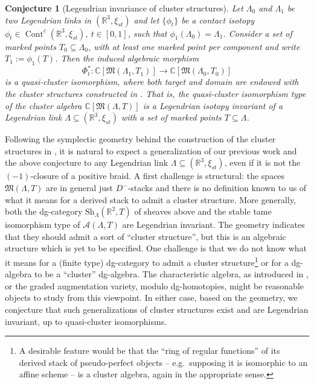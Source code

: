 \documentclass[10pt]{amsart}
\theoremstyle{plain}
\newtheorem{conj}[thm]{Conjecture}
\theoremstyle{definition}
\theoremstyle{remark}
\numberwithin{equation}{section}
\newcommand{\R}{\mathbb{R}}
\newcommand{\C}{\mathbb{C}}
\newcommand{\SA}{\mathcal{A}}
\newcommand{\fM}{\mathfrak{M}}
\newcommand{\La}{\Lambda}
\newcommand{\sse}{\subseteq}
\newcommand{\lr}{\longrightarrow}
\newcommand{\Cont}{\operatorname{Cont}}
\renewcommand{\C}{\mathbb{C}}
\newcommand{\MG}[1]{{\color{teal}{{\bf Misha}: #1}}}
\begin{document}
\begin{conj}[Legendrian invariance of cluster structures]
Let $\La_0$ and $\La_1$ be two Legendrian links in $(\R^3,\xi_{st})$ and let $\{\phi_t\}$ be a contact isotopy $\phi_t\in\Cont^c(\R^3,\xi_{st})$, ${t\in[0,1]}$, such that $\phi_1(\La_0)=\La_1$. Consider a set of marked points $T_0\sse\La_0$, with at least one marked point per component and write $T_1:=\phi_1(T)$. Then the induced algebraic morphism
$$\Phi_t^*:\C[\mathfrak{M}(\La_1,T_1)]\lr\C[\fM(\La_0,T_0)]$$
is a quasi-cluster isomorphism, where both target and domain are endowed with the cluster structures constructed in \cite{cgglss}. That is, the quasi-cluster isomorphism type of the cluster algebra $\C[\mathfrak{M}(\La,T)]$ is a Legendrian isotopy invariant of a Legendrian link $\La\sse(\R^3,\xi_{st})$ with a set of marked points $T\sse\La$.
\end{conj}

Following the symplectic geometry behind the construction of the cluster structures in \cite{cgglss,CasalsWeng22}, it is natural to expect a generalization of our previous work and the above conjecture to any Legendrian link $\La\sse(\R^3,\xi_{st})$, even if it is not the $(-1)$-closure of a positive braid. A first challenge is structural: the spaces $\fM(\La,T)$ are in general just $D^-$-stacks %
and there is no definition known to us of what it means for a derived stack to admit a cluster structure. More generally, both the dg-category $\mbox{Sh}_\La(\R^2,T)$ of sheaves above and the stable tame isomorphism type of $\SA(\La,T)$ are Legendrian invariant. The geometry indicates that they should admit a sort of ``cluster structure'', but this is an algebraic structure which is yet to be specified. One challenge is that we do not know what it means for a (finite type) dg-category to admit a cluster structure\footnote{A desirable feature would be that the ``ring of regular functions'' of its derived stack of pseudo-perfect objects -- e.g.~supposing it is isomorphic to an affine scheme -- is a cluster algebra, again in the appropriate sense.} or for a dg-algebra to be a ``cluster'' dg-algebra. The characteristic algebra, as introduced in \cite[Section 3]{Ng03}, or the graded augmentation variety, modulo dg-homotopies, might be reasonable objects to study from this viewpoint. In either case, based on the geometry, we conjecture that such generalizations of cluster structures exist and are Legendrian invariant, up to quasi-cluster isomorphisms.

\end{document}
